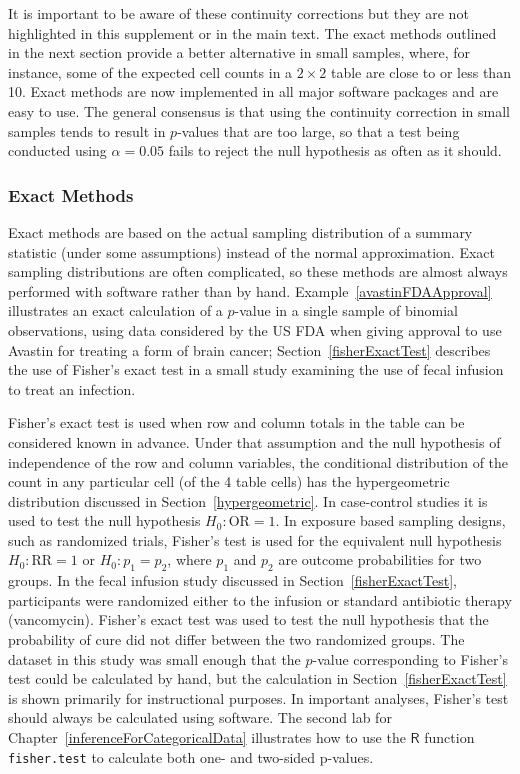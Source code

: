 It is important to be aware of these continuity corrections but they are not highlighted in this supplement or in the main text. The exact methods outlined in the next section provide a better alternative in small samples, where, for instance, some of the expected cell counts in a $2 \times 2$ table are close to or less than 10.  Exact methods are now implemented in all major software packages and are easy to use.   The general consensus is that using the continuity correction in small samples tends to result in $p$-values that are too large, so that a test being conducted using $\alpha = 0.05$ fails to reject the null hypothesis as often as it should.

\subsubsection{Exact Methods}

Exact methods are based on the actual sampling distribution of a summary statistic (under some assumptions) instead of the normal approximation.  Exact sampling distributions are often complicated, so these methods are almost always performed with software rather than by hand. Example~\ref{avastinFDAApproval} illustrates an exact calculation of a $p$-value in a single sample of binomial observations, using data considered by the US FDA when giving approval to use Avastin for treating a form of brain cancer; Section~\ref{fisherExactTest} describes the use of Fisher's exact test in a small study examining the use of fecal infusion to treat an infection.

Fisher's exact test is used when row and column totals in the table can be considered known in advance.  Under that assumption and the null hypothesis of independence of the row and column variables, the conditional distribution of the count in any particular cell (of the 4 table cells) has the hypergeometric distribution discussed in Section~\ref{hypergeometric}. In case-control studies it is used to test the null hypothesis $H_0: \text{OR} = 1$.    In exposure based sampling designs, such as randomized trials, Fisher's test is used for the equivalent null hypothesis $H_0: \text{RR} = 1$ or $H_0: p_1 = p_2$, where $p_1$ and $p_2$ are outcome probabilities for two groups. In the fecal infusion study discussed in Section~\ref{fisherExactTest}, participants were randomized either to the infusion or standard antibiotic therapy (vancomycin). Fisher's exact test was used to test the null hypothesis that the probability of cure did not differ between the two randomized groups.  The dataset in this study was small enough that the $p$-value corresponding to Fisher's test could be calculated by hand, but the calculation in Section~\ref{fisherExactTest} is shown primarily for instructional purposes. In important analyses, Fisher's test should always be calculated using software.  The second lab for Chapter~\ref{inferenceForCategoricalData} illustrates how to use the $\textsf{R}$ function \texttt{fisher.test} to calculate both one- and two-sided p-values.


